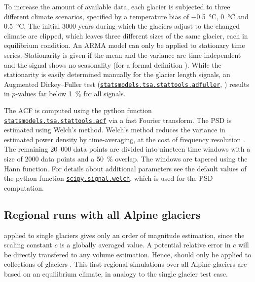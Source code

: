         To increase the amount of available data, each glacier is subjected to three different climate scenarios, specified by a temperature bias of \SI{-0.5}{\celsius}, \SI{0}{\celsius} and \SI{+0.5}{\celsius}. The initial 3000 years during which the glaciers adjust to the changed climate are clipped, which leaves three different sizes of the same glacier, each in equilibrium condition. An ARMA model can only be applied to stationary time series. Stationarity is given if the mean and the variance are time independent and the signal shows no seasonality (for a formal definition \citet[e.g.,][]{BoxJenkins2015}). While the stationarity is easily determined manually for the glacier length signals, an Augmented Dickey--Fuller test (\href{https://www.statsmodels.org/devel/generated/statsmodels.tsa.stattools.adfuller.html}{\lstinline`statsmodels.tsa.stattools.adfuller`}, \citet{Cheung1995-ADFuller}) results in $p$-values far below \SI{1}{\percent} for all signals.

        The ACF is computed using the python function \href{https://www.statsmodels.org/devel/generated/statsmodels.tsa.stattools.acf.html}{\lstinline`statsmodels.tsa.stattools.acf`} via a fast Fourier transform. The PSD is estimated using Welch's method. Welch's method reduces the variance in  estimated power density by time-averaging, at the cost of frequency resolution \citep[e.g.,][]{Welch1967, Proakis2007}.  The remaining 20\ 000 data points are divided into nineteen time windows with a size of 2000 data points and a \SI{50}{\percent} overlap. The windows are tapered using the Hann function. For details about additional parameters see the default values of the python function \href{https://docs.scipy.org/doc/scipy/reference/generated/scipy.signal.welch.html}{\lstinline`scipy.signal.welch`}, which is used for the PSD computation.
    

    \subsection{Regional runs with all Alpine glaciers} %
    \label{sub:regional_runs_with_all_alpine_glaciers_setup}
        \Vas{} applied to single glaciers gives only an order of magnitude estimation, since the scaling constant $c$ is a globally averaged value. A potential relative error in $c$ will be directly transfered to any volume estimation. Hence, \vas{} should only be applied to collections of glaciers \citep{Bahr2015}. 
        This first regional simulations over all Alpine glaciers are based on an equilibrium climate, in analogy to the single glacier test case.

